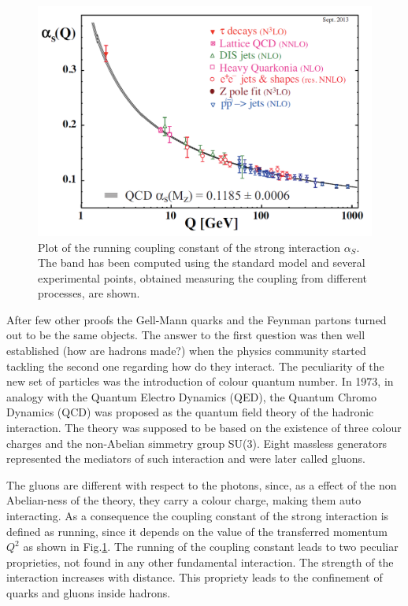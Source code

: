 \begin{figure}[!t]
\begin{center}
\includegraphics[width=0.85\linewidth]{Chapters/Introduction/Figs/QCD-running-coupling.png}
\caption{Plot of the running coupling constant of the strong interaction $\alpha_S$. The band has been computed using the standard model and several experimental points, obtained measuring the coupling from different processes, are shown.}
\label{fig:running}
\end{center}
\end{figure}

After few other proofs the Gell-Mann quarks and the Feynman partons turned out to be the same objects.
The answer to the first question was then well established (how are hadrons made?) when the physics community started tackling the second one regarding how do they interact.
The peculiarity of the new set of particles was the introduction of colour quantum number.
In 1973, in analogy with the Quantum Electro Dynamics (QED), the Quantum Chromo Dynamics (QCD) was proposed as the quantum field theory of the hadronic interaction.
The theory was supposed to be based on the existence of three colour charges and the non-Abelian simmetry group SU(3).
Eight massless generators represented the mediators of such interaction and were later called gluons.

The gluons are different with respect to the photons, since, as a effect of the non Abelian-ness of the theory, they carry a colour charge, making them auto interacting.
As a consequence the coupling constant of the strong interaction is defined as running, since it depends on the value of the transferred momentum $Q^2$ as shown in Fig.\ref{fig:running}.
The running of the coupling constant leads to two peculiar proprieties, not found in any other fundamental interaction.
The strength of the interaction increases with distance.
This propriety leads to the confinement of quarks and gluons inside hadrons.


